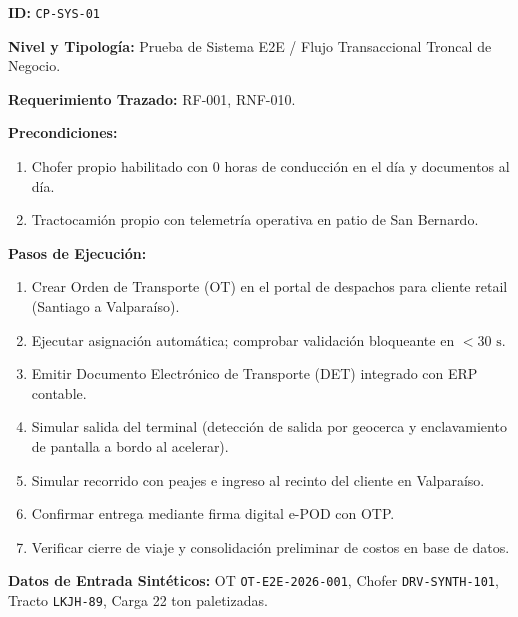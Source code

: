 \par\noindent\textbf{ID:} \texttt{C\allowbreak{}P\allowbreak{}-\allowbreak{}S\allowbreak{}Y\allowbreak{}S\allowbreak{}-\allowbreak{}0\allowbreak{}1\allowbreak{}}\par
\par\noindent\textbf{Nivel y Tipología:} Prueba de Sistema E2E / Flujo Transaccional Troncal de Negocio.\par
\par\noindent\textbf{Requerimiento Trazado:} RF-001, RNF-010.\par
\par\noindent\textbf{Precondiciones:} \par
\begin{enumerate}
\item Chofer propio habilitado con 0 horas de conducción en el día y documentos al día.
\item Tractocamión propio con telemetría operativa en patio de San Bernardo.
\end{enumerate}
\par\noindent\textbf{Pasos de Ejecución:} \par
\begin{enumerate}
\item Crear Orden de Transporte (OT) en el portal de despachos para cliente retail (Santiago a Valparaíso).
\item Ejecutar asignación automática; comprobar validación bloqueante en \(< 30\text{ s}\).
\item Emitir Documento Electrónico de Transporte (DET) integrado con ERP contable.
\item Simular salida del terminal (detección de salida por geocerca y enclavamiento de pantalla a bordo al acelerar).
\item Simular recorrido con peajes e ingreso al recinto del cliente en Valparaíso.
\item Confirmar entrega mediante firma digital e-POD con OTP.
\item Verificar cierre de viaje y consolidación preliminar de costos en base de datos.
\end{enumerate}
\par\noindent\textbf{Datos de Entrada Sintéticos:} OT \texttt{O\allowbreak{}T\allowbreak{}-\allowbreak{}E\allowbreak{}2\allowbreak{}E\allowbreak{}-\allowbreak{}2\allowbreak{}0\allowbreak{}2\allowbreak{}6\allowbreak{}-\allowbreak{}0\allowbreak{}0\allowbreak{}1\allowbreak{}}, Chofer \texttt{D\allowbreak{}R\allowbreak{}V\allowbreak{}-\allowbreak{}S\allowbreak{}Y\allowbreak{}N\allowbreak{}T\allowbreak{}H\allowbreak{}-\allowbreak{}1\allowbreak{}0\allowbreak{}1\allowbreak{}}, Tracto \texttt{L\allowbreak{}K\allowbreak{}J\allowbreak{}H\allowbreak{}-\allowbreak{}8\allowbreak{}9\allowbreak{}}, Carga 22 ton paletizadas.\par
